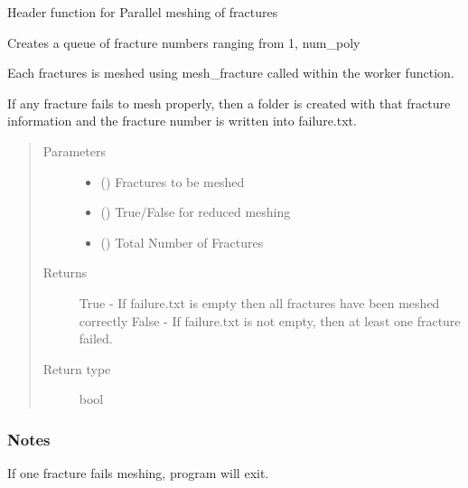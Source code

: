 \documentclass[letterpaper,10pt,english]{sphinxmanual}
\begin{document}
\begin{fulllineitems}
\label{\detokenize{pydfnworks:pydfnworks.dfnGen.run_meshing.mesh_fractures_header}}
Header function for Parallel meshing of fractures

Creates a queue of fracture numbers ranging from 1, num\_poly

Each fractures is meshed using mesh\_fracture called within the
worker function.

If any fracture fails to mesh properly, then a folder is created with
that fracture information and the fracture number is written into
failure.txt.
\begin{quote}\begin{description}
\item[{Parameters}] \leavevmode\begin{itemize}
\item {} 
 () \textendash{} Fractures to be meshed

\item {} 
 () \textendash{} True/False for reduced meshing

\item {} 
 () \textendash{} Total Number of Fractures

\end{itemize}

\item[{Returns}] \leavevmode
{} \textendash{} True - If failure.txt is empty then all fractures have been meshed correctly
False - If failure.txt is not empty, then at least one fracture failed.

\item[{Return type}] \leavevmode
bool

\end{description}\end{quote}
\subsubsection*{Notes}

If one fracture fails meshing, program will exit.

\end{fulllineitems}
\end{document}
